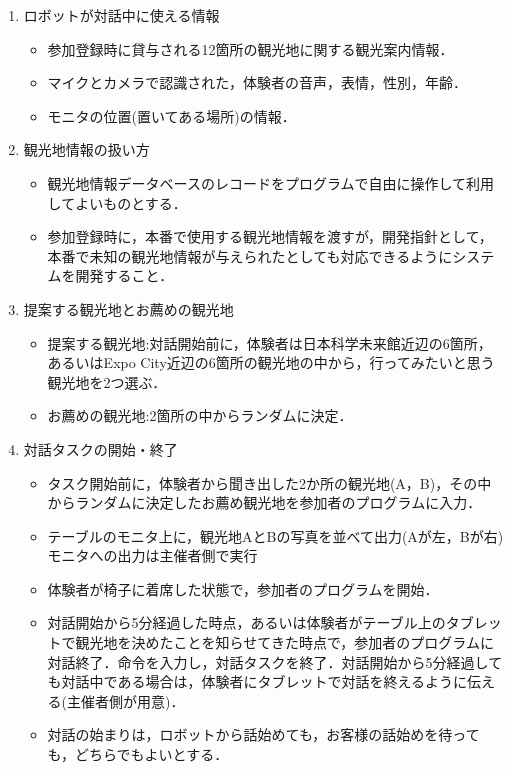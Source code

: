 \begin{enumerate}
\begin{itemize}
    \end{itemize}
    \item ロボットが対話中に使える情報
    \begin{itemize}
        \item 参加登録時に貸与される12箇所の観光地に関する観光案内情報．
        \item マイクとカメラで認識された，体験者の音声，表情，性別，年齢．
        \item モニタの位置(置いてある場所)の情報．
    \end{itemize}
    \item 観光地情報の扱い方
    \begin{itemize}
        \item 観光地情報データベースのレコードをプログラムで自由に操作して利用してよいものとする．
        \item 参加登録時に，本番で使用する観光地情報を渡すが，開発指針として，本番で未知の観光地情報が与えられたとしても対応できるようにシステムを開発すること．
    \end{itemize}
    \item 提案する観光地とお薦めの観光地
    \begin{itemize}
        \item 提案する観光地:対話開始前に，体験者は日本科学未来館近辺の6箇所，あるいはExpo City近辺の6箇所の観光地の中から，行ってみたいと思う観光地を2つ選ぶ．
        \item お薦めの観光地:2箇所の中からランダムに決定．
    \end{itemize}
    \item 対話タスクの開始・終了
    \begin{itemize}
        \item タスク開始前に，体験者から聞き出した2か所の観光地(A，B)，その中からランダムに決定したお薦め観光地を参加者のプログラムに入力．
        \item テーブルのモニタ上に，観光地AとBの写真を並べて出力(Aが左，Bが右)モニタへの出力は主催者側で実行
        \item 体験者が椅子に着席した状態で，参加者のプログラムを開始．
        \item 対話開始から5分経過した時点，あるいは体験者がテーブル上のタブレットで観光地を決めたことを知らせてきた時点で，参加者のプログラムに対話終了．命令を入力し，対話タスクを終了．対話開始から5分経過しても対話中である場合は，体験者にタブレットで対話を終えるように伝える(主催者側が用意)．
        \item 対話の始まりは，ロボットから話始めても，お客様の話始めを待っても，どちらでもよいとする．

\end{itemize}
\end{enumerate}
